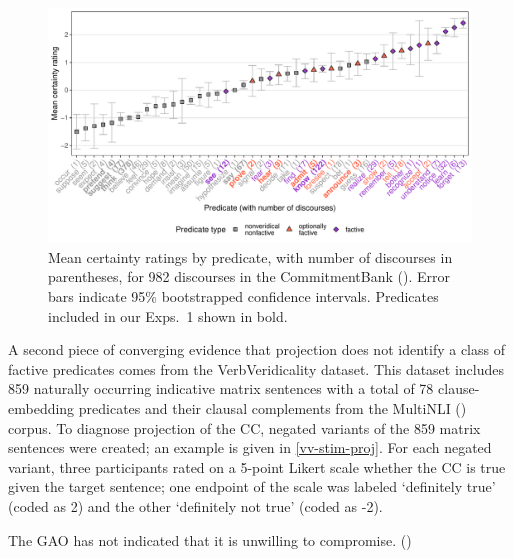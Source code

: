 \documentclass{language}
\newcommand{\6}{\mbox{$[\hspace*{-.6mm}[$}}
\newcommand{\9}{\mbox{$]\hspace*{-.6mm}]$}}
\begin{document}
\begin{figure}[H]
\centering
\includegraphics[width=.75\paperwidth]{Language-figures/color/Figure5.pdf}

\caption{Mean certainty ratings by predicate, with number of discourses in parentheses, for 982 discourses in the CommitmentBank (\citealt*{demarneffe-etal-sub23}). Error bars indicate 95\% bootstrapped confidence intervals. Predicates included in our Exps.~1 shown in bold.}
\label{f-commitmentbank}
\end{figure}

A second piece of converging evidence that projection does not identify a class of factive predicates comes from the VerbVeridicality dataset. This dataset includes 859 naturally occurring indicative matrix sentences with a total of 78 clause-embedding predicates and their clausal complements from the MultiNLI (\citealt{williams-etal2018}) corpus. To diagnose projection of the CC, negated variants of the 859 matrix sentences were created; an example is given in \ref{vv-stim-proj}. For each negated variant, three participants rated on a 5-point Likert scale whether the CC is true given the target sentence; one endpoint of the scale was labeled `definitely true' (coded as 2) and the other `definitely not true' (coded as -2).

\begin{exe}
\ex\label{vv-stim-proj} The GAO has not indicated that it is unwilling to compromise. \hfill (\citealt[2234]{ross-pavlick2019})
\end{exe}
\end{document}
